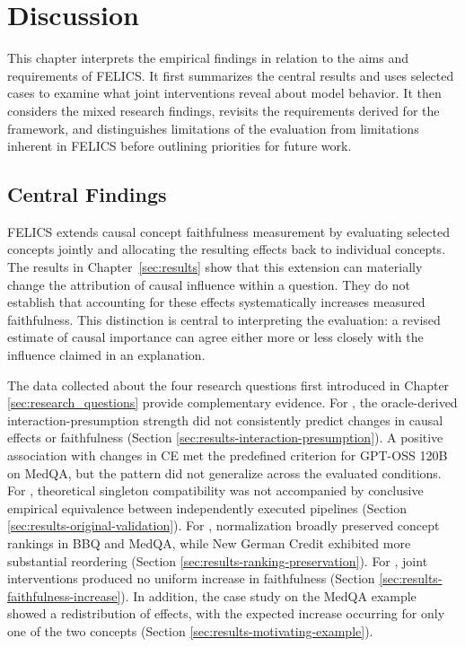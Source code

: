\chapter{Discussion}
\label{ch:discussion}

This chapter interprets the empirical findings in relation to the aims and requirements of FELICS. It first summarizes the central results and uses selected cases to examine what joint interventions reveal about model behavior. It then considers the mixed research findings, revisits the requirements derived for the framework, and distinguishes limitations of the evaluation from limitations inherent in FELICS before outlining priorities for future work.

\section{Central Findings}
\label{sec:central_findings}

FELICS extends causal concept faithfulness measurement by evaluating selected concepts jointly and allocating the resulting effects back to individual concepts. The results in Chapter~\ref{sec:results} show that this extension can materially change the attribution of causal influence within a question. They do not establish that accounting for these effects systematically increases measured faithfulness. This distinction is central to interpreting the evaluation: a revised estimate of causal importance can agree either more or less closely with the influence claimed in an explanation.

The data collected about the four research questions first introduced in Chapter \ref{sec:research_questions} provide complementary evidence. For , the oracle-derived interaction-presumption strength did not consistently predict changes in causal effects or faithfulness (Section \ref{sec:results-interaction-presumption}). A positive association with changes in CE met the predefined criterion for GPT-OSS 120B on MedQA, but the pattern did not generalize across the evaluated conditions. For , theoretical singleton compatibility was not accompanied by conclusive empirical equivalence between independently executed pipelines (Section \ref{sec:results-original-validation}). For , normalization broadly preserved concept rankings in BBQ and MedQA, while New German Credit exhibited more substantial reordering (Section \ref{sec:results-ranking-preservation}). For , joint interventions produced no uniform increase in faithfulness (Section \ref{sec:results-faithfulness-increase}). In addition, the case study on the MedQA example showed a redistribution of effects, with the expected increase occurring for only one of the two concepts (Section \ref{sec:results-motivating-example}).

